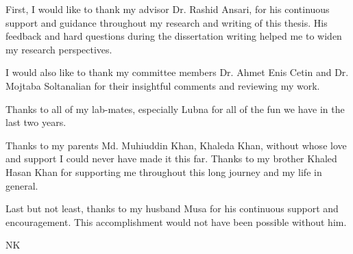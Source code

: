 \acknowledgements

First, I would like to thank my advisor Dr. Rashid Ansari, for his continuous support and guidance throughout my research and writing of this thesis.  
His feedback and hard questions during the dissertation writing helped me to widen my research perspectives.  

I would also like to thank my committee members Dr. Ahmet Enis Cetin and Dr. Mojtaba Soltanalian for their insightful comments and reviewing my work.

Thanks to all of my lab-mates, especially Lubna for all of the fun we have in the last two years. 

Thanks to my parents Md. Muhiuddin Khan, Khaleda Khan, without whose love and support I could never have made it this far. 
Thanks to my brother Khaled Hasan Khan for supporting me throughout this long journey and my life in general.

Last but not least, thanks to my husband Musa for his continuous support and encouragement. This accomplishment would not have been possible without him.







\begin{flushright}
\vspace{15mm}



NK

\end{flushright}

